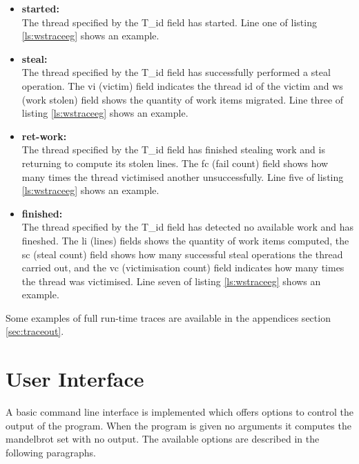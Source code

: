 \begin{itemize}
\item \textbf{started:} \\
        The thread specified by the T\_id field has started. Line one of listing \ref{ls:wstraceeg} shows an example.

\item \textbf{steal:} \\
        The thread specified by the T\_id field has successfully performed a steal
        operation. The vi (victim) field indicates the thread id of the victim and ws (work stolen) field shows
        the quantity of work items migrated. Line three of listing \ref{ls:wstraceeg} shows an example.

\item \textbf{ret-work:} \\
        The thread specified by the T\_id field has finished stealing work and is returning to compute its stolen 
        lines. The fc (fail count) field shows how many times the thread victimised another unsuccessfully. 
        Line five of listing \ref{ls:wstraceeg} shows an example.
        
\item \textbf{finished:} \\
        The thread specified by the T\_id field has detected no available work and has fineshed. The li (lines) fields shows the
        quantity of work items computed, the sc (steal count) field shows how many successful steal operations the thread carried out, 
        and the vc (victimisation count) field indicates how many times the thread was victimised.
        Line seven of listing \ref{ls:wstraceeg} shows an example.
        
\end{itemize}

Some examples of full run-time traces are available in the appendices section \ref{sec:traceout}.

\section{User Interface}
\label{sec:userint}

A basic command line interface is implemented which offers options to control the output of the program.
When the program is given no arguments it computes the mandelbrot set with no output.
The available options are described in the following paragraphs.

